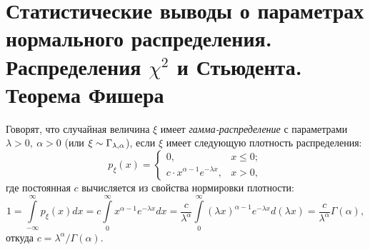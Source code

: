 \section{Статистические выводы о параметрах нормального распределения. Распределения \texorpdfstring{$\chi^{2}$}{хи-квадрат} и Стьюдента. Теорема Фишера}

\begin{defn}
    Говорят, что случайная величина $\xi$ имеет \textit{гамма-распределение} с параметрами $\lambda > 0,~ \alpha > 0$ (или $\xi \sim \operatorname{\Gamma}_{\lambda, \alpha}$), 
    если $\xi$ имеет следующую плотность распределения:
    \begin{equation*}
        p_{\xi}(x) = \begin{cases}
            0, & x \leqslant 0; \\
            c \cdot x^{\alpha-1} e^{-\lambda x}, & x > 0,
        \end{cases}
    \end{equation*}
    где постоянная $c$ вычисляется из свойства нормировки плотности:
    \begin{equation*}
        1 = 
        \int\limits_{-\infty}^{\infty} p_{\xi}(x) d x = 
        c \int\limits_{0}^{\infty} x^{\alpha-1} e^{-\lambda x} d x = 
        \frac{c}{\lambda^{\alpha}} \int\limits_{0}^{\infty}(\lambda x)^{\alpha-1} e^{-\lambda x} d(\lambda x) = 
        \frac{c}{\lambda^{\alpha}} \Gamma(\alpha),
    \end{equation*}
    откуда $c=\lambda^{\alpha} / \Gamma(\alpha)$.
\end{defn}

